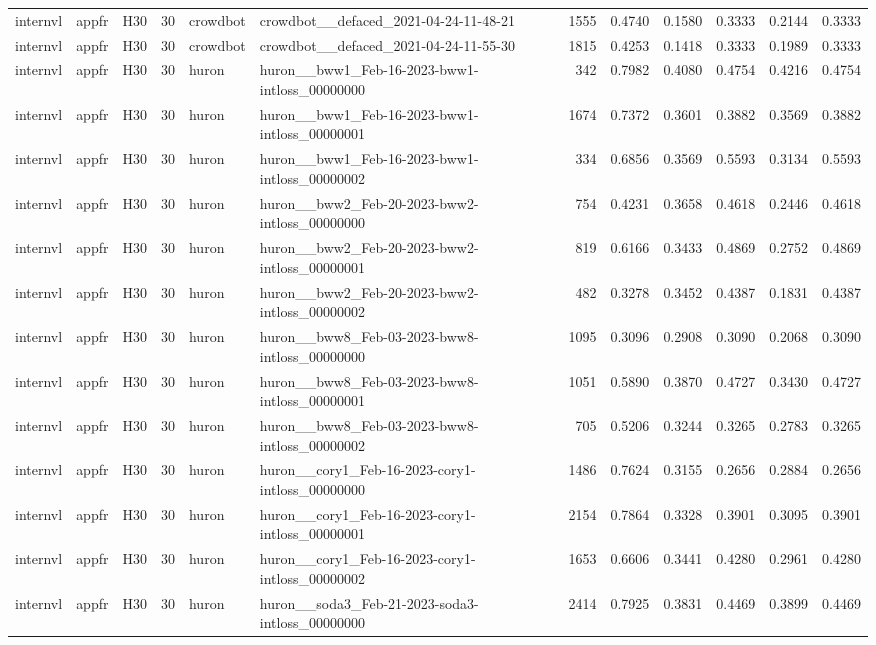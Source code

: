 \begin{table}[tbp]
\begin{tabular}{lllrllrrrrrr}
internvl & appfr & H30 & 30 & crowdbot & crowdbot\_\_defaced\_2021-04-24-11-48-21 & 1555 & 0.4740 & 0.1580 & 0.3333 & 0.2144 & 0.3333 \\
internvl & appfr & H30 & 30 & crowdbot & crowdbot\_\_defaced\_2021-04-24-11-55-30 & 1815 & 0.4253 & 0.1418 & 0.3333 & 0.1989 & 0.3333 \\
internvl & appfr & H30 & 30 & huron & huron\_\_bww1\_Feb-16-2023-bww1-intloss\_00000000 & 342 & 0.7982 & 0.4080 & 0.4754 & 0.4216 & 0.4754 \\
internvl & appfr & H30 & 30 & huron & huron\_\_bww1\_Feb-16-2023-bww1-intloss\_00000001 & 1674 & 0.7372 & 0.3601 & 0.3882 & 0.3569 & 0.3882 \\
internvl & appfr & H30 & 30 & huron & huron\_\_bww1\_Feb-16-2023-bww1-intloss\_00000002 & 334 & 0.6856 & 0.3569 & 0.5593 & 0.3134 & 0.5593 \\
internvl & appfr & H30 & 30 & huron & huron\_\_bww2\_Feb-20-2023-bww2-intloss\_00000000 & 754 & 0.4231 & 0.3658 & 0.4618 & 0.2446 & 0.4618 \\
internvl & appfr & H30 & 30 & huron & huron\_\_bww2\_Feb-20-2023-bww2-intloss\_00000001 & 819 & 0.6166 & 0.3433 & 0.4869 & 0.2752 & 0.4869 \\
internvl & appfr & H30 & 30 & huron & huron\_\_bww2\_Feb-20-2023-bww2-intloss\_00000002 & 482 & 0.3278 & 0.3452 & 0.4387 & 0.1831 & 0.4387 \\
internvl & appfr & H30 & 30 & huron & huron\_\_bww8\_Feb-03-2023-bww8-intloss\_00000000 & 1095 & 0.3096 & 0.2908 & 0.3090 & 0.2068 & 0.3090 \\
internvl & appfr & H30 & 30 & huron & huron\_\_bww8\_Feb-03-2023-bww8-intloss\_00000001 & 1051 & 0.5890 & 0.3870 & 0.4727 & 0.3430 & 0.4727 \\
internvl & appfr & H30 & 30 & huron & huron\_\_bww8\_Feb-03-2023-bww8-intloss\_00000002 & 705 & 0.5206 & 0.3244 & 0.3265 & 0.2783 & 0.3265 \\
internvl & appfr & H30 & 30 & huron & huron\_\_cory1\_Feb-16-2023-cory1-intloss\_00000000 & 1486 & 0.7624 & 0.3155 & 0.2656 & 0.2884 & 0.2656 \\
internvl & appfr & H30 & 30 & huron & huron\_\_cory1\_Feb-16-2023-cory1-intloss\_00000001 & 2154 & 0.7864 & 0.3328 & 0.3901 & 0.3095 & 0.3901 \\
internvl & appfr & H30 & 30 & huron & huron\_\_cory1\_Feb-16-2023-cory1-intloss\_00000002 & 1653 & 0.6606 & 0.3441 & 0.4280 & 0.2961 & 0.4280 \\
internvl & appfr & H30 & 30 & huron & huron\_\_soda3\_Feb-21-2023-soda3-intloss\_00000000 & 2414 & 0.7925 & 0.3831 & 0.4469 & 0.3899 & 0.4469 \\

\end{tabular}
\end{table}
